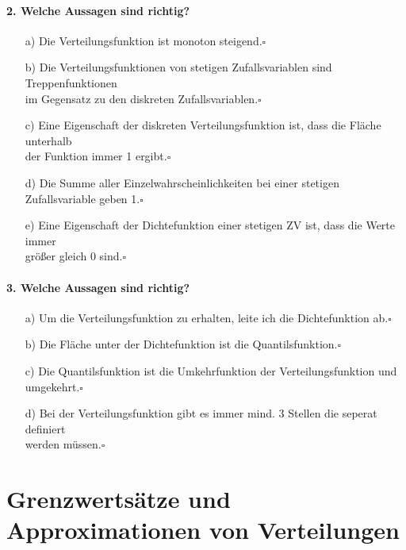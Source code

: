 \documentclass[a4paper]{article}
\begin{document}
\paragraph{2. Welche Aussagen sind richtig?}
\begin{itemize}
    \item[a)]Die Verteilungsfunktion ist monoton steigend.\hfill $\square$
    \item[b)]Die Verteilungsfunktionen von stetigen Zufallsvariablen sind Treppenfunktionen \\im Gegensatz zu den diskreten Zufallsvariablen.\hfill $\square$
    \item[c)] Eine Eigenschaft der diskreten Verteilungsfunktion ist, dass die Fläche unterhalb \\der Funktion immer 1 ergibt.\hfill $\square$
    \item[d)]Die Summe aller Einzelwahrscheinlichkeiten bei einer stetigen Zufallsvariable geben 1.\hfill $\square$
    \item[e)]Eine Eigenschaft der Dichtefunktion einer stetigen ZV ist, dass die Werte immer \\größer gleich 0 sind.\hfill $\square$
\end{itemize}

\paragraph{3. Welche Aussagen sind richtig?}
\begin{itemize}
    \item[a)]Um die Verteilungsfunktion zu erhalten, leite ich die Dichtefunktion ab.\hfill $\square$
    \item[b)]Die Fläche unter der Dichtefunktion ist die Quantilsfunktion.\hfill $\square$
    \item[c)]Die Quantilsfunktion ist die Umkehrfunktion der Verteilungsfunktion und umgekehrt.\hfill $\square$
    \item[d)]Bei der Verteilungsfunktion gibt es immer mind. 3 Stellen die seperat definiert\\ werden müssen.\hfill $\square$
\end{itemize}


\clearpage


\section{Grenzwertsätze und Approximationen von Verteilungen} \label{sec:GWSapprox}
\end{document}
